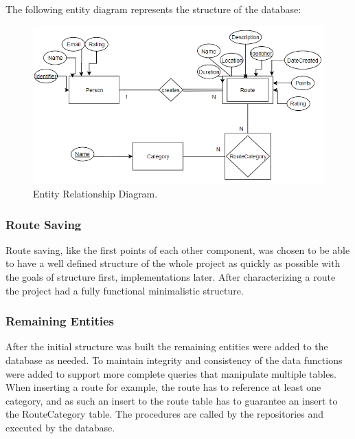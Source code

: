 \documentclass{article}
\begin{document}
            The following entity diagram represents the structure of the database:
            \begin{figure}[h]            
                \includegraphics[width=\textwidth]{images/project-structure/dbms-structure.PNG}
                \caption{Entity Relationship Diagram.}
            \end{figure}  

            \subsubsection*{Route Saving}
            Route saving, like the first points of each other component, was chosen to be able to have a well defined structure of the whole project as quickly as 
            possible with the goals of structure first, implementations later. After characterizing a route \cite{dbmsroutecharacterization} the project had a fully functional minimalistic structure.

            \subsubsection*{Remaining Entities}
            After the initial structure was built the remaining entities were added to the database as needed. To maintain integrity and consistency of the data functions were added to support more complete queries that manipulate multiple tables.
            When inserting a route for example, the route has to reference at least one category, and as such an insert to the route table has to guarantee an insert to the RouteCategory table. The procedures are called by the repositories and executed by the database.

            \newpage
        
\end{document}
